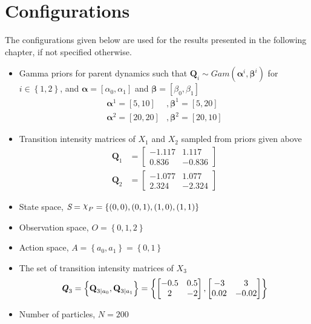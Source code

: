 \section{Configurations}
The configurations given below are used for the results presented in the following chapter, if not specified otherwise.
\begin{itemize}
	\item Gamma priors for parent dynamics such that $ \textbf{Q}_{i} \sim Gam(\boldsymbol{\alpha}^i, \boldsymbol{\beta}^i)$ for $i \in \left\lbrace 1,2\right\rbrace $, and $ \boldsymbol{\alpha} = [\alpha_0, \alpha_1] $ and $ \boldsymbol{\beta} = [\beta_0, \beta_1] $
	\begin{align}
		\boldsymbol{\alpha}^1 = [5,10] &, \boldsymbol{\beta}^1 = [5,20] \\
		\boldsymbol{\alpha}^2 = [20,20] &, \boldsymbol{\beta}^2 = [20,10]
		\label{eq:gamma_params}
	\end{align}
	\item Transition intensity matrices of $ X_1 $ and $ X_2 $ sampled from priors given above
	\begin{align}
		\textbf{Q}_1 &= 
		\begin{bmatrix}
		-1.117 & 1.117 \\
		0.836 &  -0.836
		\end{bmatrix} \\
		\textbf{Q}_2 &= 
		\begin{bmatrix}
		-1.077 & 1.077 \\
		2.324 &  -2.324
		\end{bmatrix}
	\end{align}
	\item State space, $ \textit{S} = \rchi_{P} = \left\lbrace (0, 0), (0, 1), (1, 0),(1, 1)\right\rbrace $
	\item Observation space, $ \textit{O} = \left\lbrace 0, 1, 2 \right\rbrace $
	\item Action space, $ \textit{A} = \left\lbrace a_{0}, a_{1} \right\rbrace = \left\lbrace 0, 1\right\rbrace $
	\item The set of transition intensity matrices of $ X_3 $
	\begin{align}
		\textbf{\textit{Q}}_3 = \left\lbrace \textbf{Q}_{3\mid a_{0}}, \textbf{Q}_{3\mid a_{1}} \right\rbrace = \left\lbrace 
			\begin{bmatrix}
			-0.5 & 0.5 \\
			2 &  -2
			\end{bmatrix}, 
			\begin{bmatrix}
			-3 & 3 \\
			0.02 &  -0.02
			\end{bmatrix} 
			\right\rbrace 
	\end{align}
	\item Number of particles, $ N = 200 $
\end{itemize}

